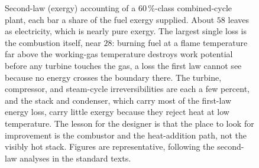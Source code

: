 \begin{figure}[htbp]
\centering
{}
\caption[Exergy destruction in a combined-cycle plant]{Second-law (exergy)
accounting of a $60\,\%$-class combined-cycle plant, each bar a share of the
fuel exergy supplied. About $58$ leaves as electricity, which is nearly pure
exergy. The largest single loss is the combustion itself, near $28$: burning
fuel at a flame temperature far above the working-gas temperature destroys
work potential before any turbine touches the gas, a loss the first law cannot
see because no energy crosses the boundary there. The turbine, compressor, and
steam-cycle irreversibilities are each a few percent, and the stack and
condenser, which carry most of the first-law energy loss, carry little exergy
because they reject heat at low temperature. The lesson for the designer is
that the place to look for improvement is the combustor and the
heat-addition path, not the visibly hot stack. Figures are representative,
following the second-law analyses in the standard texts.}
\label{fig:vol04ch03:exergy-destruction}
\end{figure}
